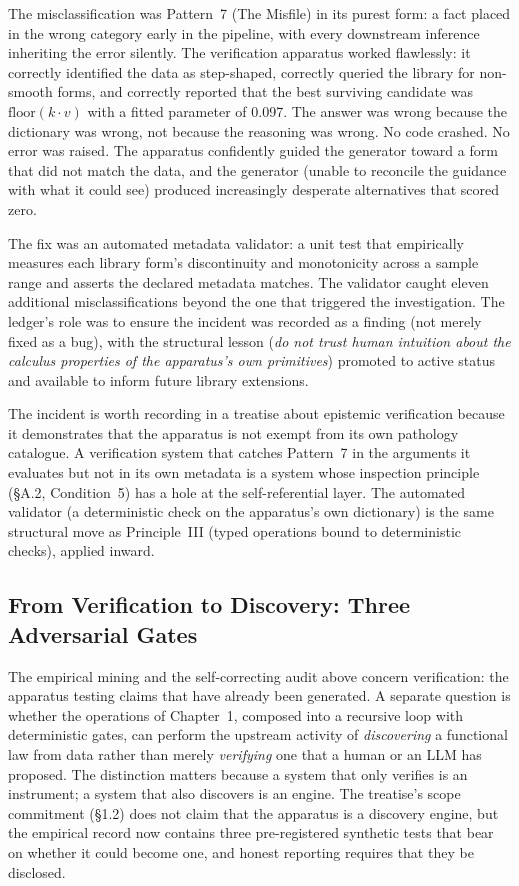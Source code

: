 \documentclass[11pt]{article}
\begin{document}
The misclassification was Pattern~7 (The Misfile) in its purest form: a fact placed in the wrong category early in the pipeline, with every downstream inference inheriting the error silently. The verification apparatus worked flawlessly: it correctly identified the data as step-shaped, correctly queried the library for non-smooth forms, and correctly reported that the best surviving candidate was $\text{floor}(k \cdot v)$ with a fitted parameter of 0.097. The answer was wrong because the dictionary was wrong, not because the reasoning was wrong. No code crashed. No error was raised. The apparatus confidently guided the generator toward a form that did not match the data, and the generator (unable to reconcile the guidance with what it could see) produced increasingly desperate alternatives that scored zero.

The fix was an automated metadata validator: a unit test that empirically measures each library form's discontinuity and monotonicity across a sample range and asserts the declared metadata matches. The validator caught eleven additional misclassifications beyond the one that triggered the investigation. The ledger's role was to ensure the incident was recorded as a finding (not merely fixed as a bug), with the structural lesson (\emph{do not trust human intuition about the calculus properties of the apparatus's own primitives}) promoted to active status and available to inform future library extensions.

The incident is worth recording in a treatise about epistemic verification because it demonstrates that the apparatus is not exempt from its own pathology catalogue. A verification system that catches Pattern~7 in the arguments it evaluates but not in its own metadata is a system whose inspection principle (\S A.2, Condition~5) has a hole at the self-referential layer. The automated validator (a deterministic check on the apparatus's own dictionary) is the same structural move as Principle~III (typed operations bound to deterministic checks), applied inward.

\subsection{From Verification to Discovery: Three Adversarial Gates}

The empirical mining and the self-correcting audit above concern verification: the apparatus testing claims that have already been generated. A separate question is whether the operations of Chapter~1, composed into a recursive loop with deterministic gates, can perform the upstream activity of \emph{discovering} a functional law from data rather than merely \emph{verifying} one that a human or an LLM has proposed. The distinction matters because a system that only verifies is an instrument; a system that also discovers is an engine. The treatise's scope commitment (\S 1.2) does not claim that the apparatus is a discovery engine, but the empirical record now contains three pre-registered synthetic tests that bear on whether it could become one, and honest reporting requires that they be disclosed.
\end{document}
